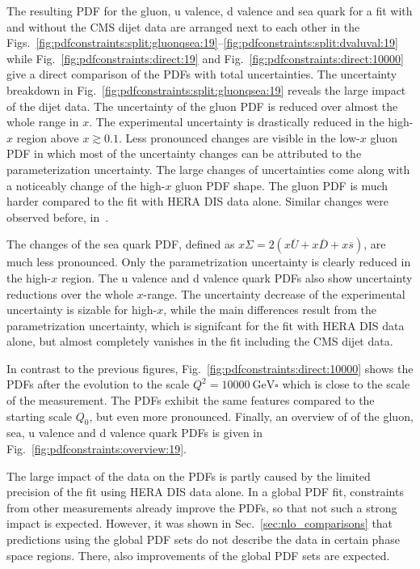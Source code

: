 The resulting PDF for the gluon, u valence, d valence and sea quark for a fit
with and without the CMS dijet data are arranged next to each other in the
Figs.~\ref{fig:pdfconstraints:split:gluonqsea:19}--\ref{fig:pdfconstraints:split:dvaluval:19}
while Fig.~\ref{fig:pdfconstraints:direct:19} and
Fig.~\ref{fig:pdfconstraints:direct:10000} give a direct comparison of the PDFs
with total uncertainties. The uncertainty breakdown in
Fig.~\ref{fig:pdfconstraints:split:gluonqsea:19} reveals the large impact of
the dijet data. The uncertainty of the gluon PDF is reduced over almost the
whole range in $x$. The experimental uncertainty is drastically reduced in the
high-$x$ region above $x \gtrsim 0.1$. Less pronounced changes are visible in
the low-$x$ gluon PDF in which most of the uncertainty changes can be attributed
to the parameterization uncertainty. The large changes of uncertainties come
along with a noticeably change of the high-$x$ gluon PDF shape. The gluon PDF is
much harder compared to the fit with HERA DIS data alone. Similar changes were
observed before, \eg in~\cite{Khachatryan:2014waa}.

The changes of the sea quark PDF, defined as $x\Sigma=2(x\overline U + x
\overline D + x\overline s)$, are much less pronounced.
Only the parametrization uncertainty is clearly reduced in the high-$x$ region.
The u valence and d valence quark PDFs also show uncertainty reductions over
the whole $x$-range. The uncertainty decrease of the experimental uncertainty is
sizable for high-$x$, while the main differences result from the parametrization
uncertainty, which is signifcant for the fit with HERA DIS data alone, but
almost completely vanishes in the fit including the CMS dijet data.

In contrast to the previous figures, Fig.~\ref{fig:pdfconstraints:direct:10000}
shows the PDFs after the evolution to the scale $Q^2 = \SI{10000}{\GeV \square}$
which is close to the scale of the measurement. The PDFs exhibit the same
features compared to the starting scale $Q_0$, but even more pronounced.
Finally, an overview of of the gluon, sea, u valence and d valence quark PDFs is
given in Fig.~\ref{fig:pdfconstraints:overview:19}. 

The large impact of the data on the PDFs is partly caused by the limited
precision of the fit using HERA DIS data alone. In a global PDF fit, constraints
from other measurements already improve the PDFs, so that not such a strong
impact is expected. However, it was shown in Sec.~\ref{sec:nlo_comparisons} that
predictions using the global PDF sets do not describe the data in certain phase
space regions. There, also improvements of the global PDF sets are expected.

